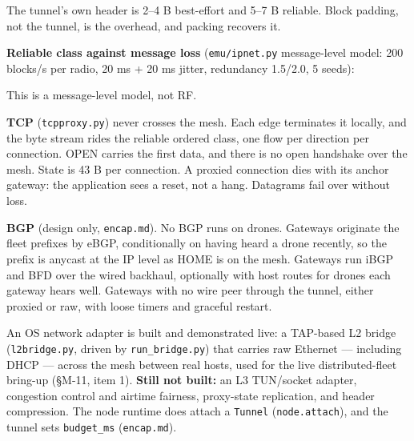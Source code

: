 \documentclass[10pt,letterpaper,twocolumn]{article}
\begin{document}
The tunnel's own header is 2--4 B best-effort and 5--7 B reliable. Block padding, not the tunnel, is the overhead, and packing recovers it.

\textbf{Reliable class against message loss} (\texttt{emu/\allowbreak{}ipnet.\allowbreak{}py} message-level model: 200 blocks/s per radio, 20 ms + 20 ms jitter, redundancy 1.5/2.0, 5 seeds):


This is a message-level model, not RF.

\textbf{TCP} (\texttt{tcpproxy.\allowbreak{}py}) never crosses the mesh. Each edge terminates it locally, and the byte stream rides the reliable ordered class, one flow per direction per connection. OPEN carries the first data, and there is no open handshake over the mesh. State is 43 B per connection. A proxied connection dies with its anchor gateway: the application sees a reset, not a hang. Datagrams fail over without loss.

\textbf{BGP} (design only, \texttt{encap.\allowbreak{}md}). No BGP runs on drones. Gateways originate the fleet prefixes by eBGP, conditionally on having heard a drone recently, so the prefix is anycast at the IP level as HOME is on the mesh. Gateways run iBGP and BFD over the wired backhaul, optionally with host routes for drones each gateway hears well. Gateways with no wire peer through the tunnel, either proxied or raw, with loose timers and graceful restart.

An OS network adapter is built and demonstrated live: a TAP-based L2 bridge (\texttt{l2bridge.\allowbreak{}py}, driven by \texttt{run\_\allowbreak{}bridge.\allowbreak{}py}) that carries raw Ethernet --- including DHCP --- across the mesh between real hosts, used for the live distributed-fleet bring-up (§M-11, item 1). \textbf{Still not built:} an L3 TUN/socket adapter, congestion control and airtime fairness, proxy-state replication, and header compression. The node runtime does attach a \texttt{Tunnel} (\texttt{node.\allowbreak{}attach}), and the tunnel sets \texttt{budget\_\allowbreak{}ms} (\texttt{encap.\allowbreak{}md}).
\end{document}
